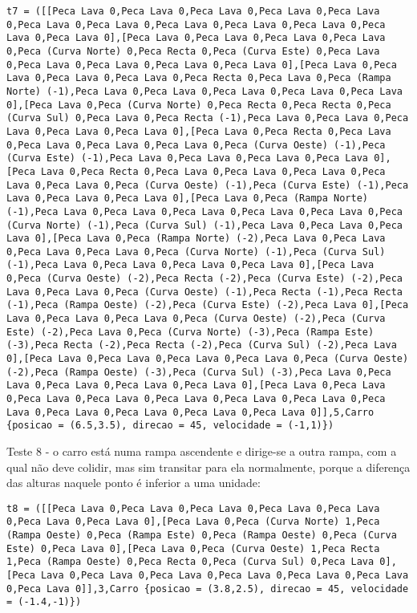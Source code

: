 \documentclass[a4paper]{report}
\begin{document}
\begin{lstlisting}
t7 = ([[Peca Lava 0,Peca Lava 0,Peca Lava 0,Peca Lava 0,Peca Lava 0,Peca Lava 0,Peca Lava 0,Peca Lava 0,Peca Lava 0,Peca Lava 0,Peca Lava 0,Peca Lava 0],[Peca Lava 0,Peca Lava 0,Peca Lava 0,Peca Lava 0,Peca (Curva Norte) 0,Peca Recta 0,Peca (Curva Este) 0,Peca Lava 0,Peca Lava 0,Peca Lava 0,Peca Lava 0,Peca Lava 0],[Peca Lava 0,Peca Lava 0,Peca Lava 0,Peca Lava 0,Peca Recta 0,Peca Lava 0,Peca (Rampa Norte) (-1),Peca Lava 0,Peca Lava 0,Peca Lava 0,Peca Lava 0,Peca Lava 0],[Peca Lava 0,Peca (Curva Norte) 0,Peca Recta 0,Peca Recta 0,Peca (Curva Sul) 0,Peca Lava 0,Peca Recta (-1),Peca Lava 0,Peca Lava 0,Peca Lava 0,Peca Lava 0,Peca Lava 0],[Peca Lava 0,Peca Recta 0,Peca Lava 0,Peca Lava 0,Peca Lava 0,Peca Lava 0,Peca (Curva Oeste) (-1),Peca (Curva Este) (-1),Peca Lava 0,Peca Lava 0,Peca Lava 0,Peca Lava 0],[Peca Lava 0,Peca Recta 0,Peca Lava 0,Peca Lava 0,Peca Lava 0,Peca Lava 0,Peca Lava 0,Peca (Curva Oeste) (-1),Peca (Curva Este) (-1),Peca Lava 0,Peca Lava 0,Peca Lava 0],[Peca Lava 0,Peca (Rampa Norte) (-1),Peca Lava 0,Peca Lava 0,Peca Lava 0,Peca Lava 0,Peca Lava 0,Peca (Curva Norte) (-1),Peca (Curva Sul) (-1),Peca Lava 0,Peca Lava 0,Peca Lava 0],[Peca Lava 0,Peca (Rampa Norte) (-2),Peca Lava 0,Peca Lava 0,Peca Lava 0,Peca Lava 0,Peca (Curva Norte) (-1),Peca (Curva Sul) (-1),Peca Lava 0,Peca Lava 0,Peca Lava 0,Peca Lava 0],[Peca Lava 0,Peca (Curva Oeste) (-2),Peca Recta (-2),Peca (Curva Este) (-2),Peca Lava 0,Peca Lava 0,Peca (Curva Oeste) (-1),Peca Recta (-1),Peca Recta (-1),Peca (Rampa Oeste) (-2),Peca (Curva Este) (-2),Peca Lava 0],[Peca Lava 0,Peca Lava 0,Peca Lava 0,Peca (Curva Oeste) (-2),Peca (Curva Este) (-2),Peca Lava 0,Peca (Curva Norte) (-3),Peca (Rampa Este) (-3),Peca Recta (-2),Peca Recta (-2),Peca (Curva Sul) (-2),Peca Lava 0],[Peca Lava 0,Peca Lava 0,Peca Lava 0,Peca Lava 0,Peca (Curva Oeste) (-2),Peca (Rampa Oeste) (-3),Peca (Curva Sul) (-3),Peca Lava 0,Peca Lava 0,Peca Lava 0,Peca Lava 0,Peca Lava 0],[Peca Lava 0,Peca Lava 0,Peca Lava 0,Peca Lava 0,Peca Lava 0,Peca Lava 0,Peca Lava 0,Peca Lava 0,Peca Lava 0,Peca Lava 0,Peca Lava 0,Peca Lava 0]],5,Carro {posicao = (6.5,3.5), direcao = 45, velocidade = (-1,1)})
\end{lstlisting}

Teste 8 - o carro está numa rampa ascendente e dirige-se a outra rampa, com a qual não deve colidir, mas sim transitar para ela normalmente, porque a diferença das alturas naquele ponto é inferior a uma unidade:

\begin{lstlisting}
t8 = ([[Peca Lava 0,Peca Lava 0,Peca Lava 0,Peca Lava 0,Peca Lava 0,Peca Lava 0,Peca Lava 0],[Peca Lava 0,Peca (Curva Norte) 1,Peca (Rampa Oeste) 0,Peca (Rampa Este) 0,Peca (Rampa Oeste) 0,Peca (Curva Este) 0,Peca Lava 0],[Peca Lava 0,Peca (Curva Oeste) 1,Peca Recta 1,Peca (Rampa Oeste) 0,Peca Recta 0,Peca (Curva Sul) 0,Peca Lava 0],[Peca Lava 0,Peca Lava 0,Peca Lava 0,Peca Lava 0,Peca Lava 0,Peca Lava 0,Peca Lava 0]],3,Carro {posicao = (3.8,2.5), direcao = 45, velocidade = (-1.4,-1)})
\end{lstlisting}
\end{document}
